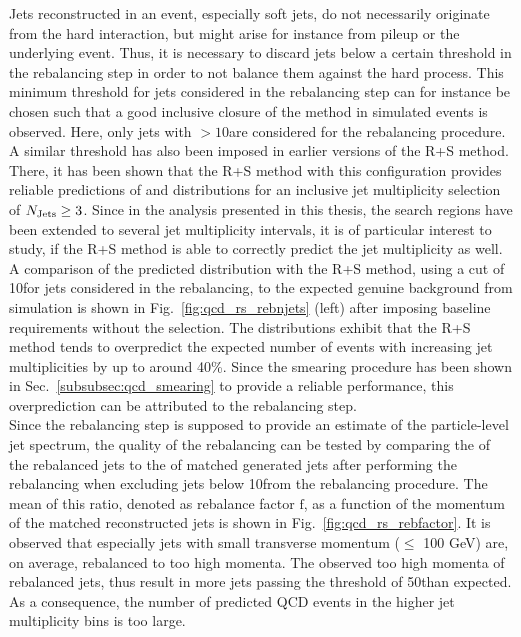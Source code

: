 Jets reconstructed in an event, especially soft jets, do not necessarily originate from the hard interaction, but might arise for instance from pileup or the underlying event. Thus, it is necessary to discard jets below a certain \pt threshold in the rebalancing step in order to not balance them against the hard process. This minimum \pt threshold for jets considered in the rebalancing step can for instance be chosen such that a good inclusive closure of the method in simulated events is observed. Here, only jets with \pt$> 10$\gev are considered for the rebalancing procedure. A similar \pt threshold has also been imposed in earlier versions of the R+S method. There, it has been shown that the R+S method with this configuration provides reliable predictions of \HT and \MHT distributions for an inclusive jet multiplicity selection of $N_{\text{Jets}} \ge 3$. Since in the analysis presented in this thesis, the search regions have been extended to several jet multiplicity intervals, it is of particular interest to study, if the R+S method is able to correctly predict the jet multiplicity as well. \\ 
A comparison of the predicted \NJets distribution with the R+S method, using a \pt cut of 10\gev for jets considered in the rebalancing, to the expected genuine background from simulation is shown in Fig.~\ref{fig:qcd_rs_rebnjets} (left) after imposing baseline requirements without the \MHT selection. The distributions exhibit that the R+S method tends to overpredict the expected number of events with increasing jet multiplicities by up to around 40\%. Since the smearing procedure has been shown in Sec.~\ref{subsubsec:qcd_smearing} to provide a reliable performance, this overprediction can be attributed to the rebalancing step. \\
Since the rebalancing step is supposed to provide an estimate of the particle-level jet spectrum, the quality of the rebalancing can be tested by comparing the \pt of the rebalanced jets to the \pt of matched generated jets after performing the rebalancing when excluding jets below 10\gev from the rebalancing procedure. The mean of this ratio, denoted as rebalance factor $\mathrm{f}$, as a function of the momentum of the matched reconstructed jets is shown in Fig.~\ref{fig:qcd_rs_rebfactor}. It is observed that especially jets with small transverse momentum (\pt $\leq$ 100 GeV) are, on average, rebalanced to too high momenta. The observed too high momenta of rebalanced jets, thus result in more jets passing the \NJets threshold of 50\gev than expected. As a consequence, the number of predicted QCD events in the higher jet multiplicity bins is too large. \\
